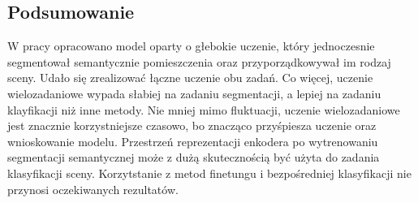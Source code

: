 \subsection{Podsumowanie}

W pracy opracowano model oparty o głebokie uczenie, który jednoczesnie segmentował semantycznie pomieszczenia oraz przyporządkowywał im rodzaj sceny. Udało się zrealizować łączne uczenie obu zadań. Co więcej, uczenie wielozadaniowe wypada słabiej na zadaniu segmentacji, a lepiej na zadaniu klayfikacji niż inne metody. Nie mniej mimo fluktuacji, uczenie wielozadaniowe jest znacznie korzystniejsze czasowo, bo znacząco przyśpiesza uczenie oraz wnioskowanie modelu. Przestrzeń reprezentacji enkodera po wytrenowaniu segmentacji semantycznej może z dużą skutecznością być użyta do zadania klasyfikacji sceny. Korzytstanie z metod finetungu i bezpośredniej klasyfikacji nie przynosi oczekiwanych rezultatów.










